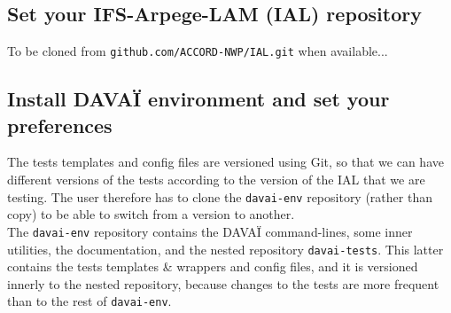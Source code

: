 \documentclass[a4paper,10pt,twoside]{article}
\begin{document}
\subsection{Set your IFS-Arpege-LAM (IAL) repository}
To be cloned from \texttt{github.com/ACCORD-NWP/IAL.git} when available...



\subsection{Install DAVAÏ environment and set your preferences \label{sect:davai_install}}

The tests templates and config files are versioned using Git, so that we can have different versions of the tests according to the version of the IAL that we are testing. The user therefore has to clone the \texttt{davai-env} repository (rather than copy) to be able to switch from a version to another.\\

The \texttt{davai-env} repository contains the DAVAÏ command-lines, some inner utilities, the documentation, and the nested repository \texttt{davai-tests}. This latter contains the tests templates \& wrappers and config files, and it is versioned innerly to the nested repository, because changes to the tests are more frequent than to the rest of \texttt{davai-env}.\\
\end{document}
